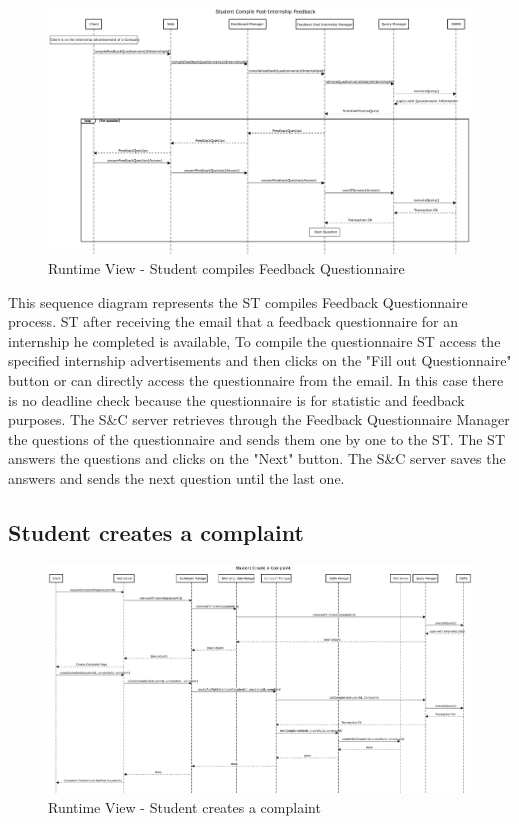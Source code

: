 \begin{figure}[H]
      \centering
      \includegraphics[width=1.0\textwidth]{Images/RV_04b.pdf}
      \caption{Runtime View - Student compiles Feedback Questionnaire}
      \label{fig:rv-student-compiles-feedback-questionnaire}
\end{figure}

\par This sequence diagram represents the ST compiles Feedback Questionnaire process. ST after receiving the email that
a feedback questionnaire for an internship he completed is available, To compile the questionnaire ST access the specified internship
advertisements and then clicks on the "Fill out Questionnaire" button or can directly access the questionnaire from the email.
In this case there is no deadline check because the questionnaire is for statistic and feedback purposes. The S\&C server retrieves
through the Feedback Questionnaire Manager the questions of the questionnaire and sends them one by one to the ST.
The ST answers the questions and clicks on the "Next" button. The S\&C server saves the answers and sends the next question
until the last one.

\subsection{Student creates a complaint}
\label{sub:student-creates-a-complaint}%

\begin{figure}[H]
      \centering
      \includegraphics[width=1.0\textwidth]{Images/RV_05.pdf}
      \caption{Runtime View - Student creates a complaint}
      \label{fig:rv-student-creates-a-complaint}
\end{figure}

